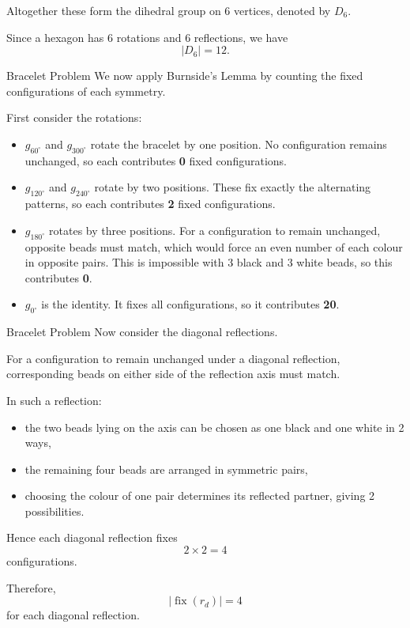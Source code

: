 \begin{frame}
  Altogether these form the dihedral group on 6 vertices, denoted by $D_6$.

  \vspace{0.5em}

  Since a hexagon has 6 rotations and 6 reflections, we have
  \[
    |D_6| = 12.
  \]
\end{frame}


\begin{frame}{Bracelet Problem}
  We now apply Burnside's Lemma by counting the fixed configurations of each symmetry.

  \vspace{0.5em}

  First consider the rotations:
  \begin{itemize}
    \item $g_{60^\circ}$ and $g_{300^\circ}$ rotate the bracelet by one position.
    No configuration remains unchanged, so each contributes \textbf{0} fixed configurations.

    \item $g_{120^\circ}$ and $g_{240^\circ}$ rotate by two positions.
    These fix exactly the alternating patterns, so each contributes \textbf{2} fixed configurations.

    \item $g_{180^\circ}$ rotates by three positions.
    For a configuration to remain unchanged, opposite beads must match, which would force an even number of each colour in opposite pairs. This is impossible with 3 black and 3 white beads, so this contributes \textbf{0}.

    \item $g_{0^\circ}$ is the identity.
    It fixes all configurations, so it contributes \textbf{20}.
  \end{itemize}
\end{frame}

\begin{frame}{Bracelet Problem}
  Now consider the diagonal reflections.

  \vspace{0.5em}

  For a configuration to remain unchanged under a diagonal reflection, corresponding beads on either side of the reflection axis must match.

  \vspace{0.5em}

  In such a reflection:
  \begin{itemize}
    \item the two beads lying on the axis can be chosen as one black and one white in 2 ways,
    \item the remaining four beads are arranged in symmetric pairs,
    \item choosing the colour of one pair determines its reflected partner, giving 2 possibilities.
  \end{itemize}

  Hence each diagonal reflection fixes
  \[
    2 \times 2 = 4
  \]
  configurations.

  Therefore,
  \[
    |\operatorname{fix}(r_d)| = 4
  \]
  for each diagonal reflection.
\end{frame}

